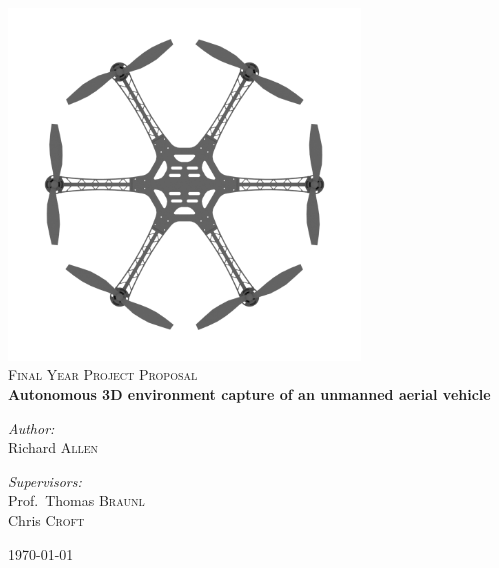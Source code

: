 \begin{titlepage}
\begin{center}
\includegraphics[width=0.7\textwidth]{./logo.png}~\\[1cm]
\textsc{\Large Final Year Project Proposal}\\[0.5cm]
{ \huge \bfseries Autonomous 3D environment capture of an unmanned aerial vehicle \\[0.4cm] }
\noindent
\begin{minipage}[t]{0.4\textwidth}
\begin{flushleft} \large
\emph{Author:}\\
Richard \textsc{Allen}
\end{flushleft}
\end{minipage}%
\begin{minipage}[t]{0.4\textwidth}
\begin{flushright} \large
\emph{Supervisors:} \\
Prof.~Thomas \textsc{Braunl}\\
Chris \textsc{Croft}
\end{flushright}
\end{minipage}
\vfill
{\large \today}
\end{center}
\end{titlepage}
